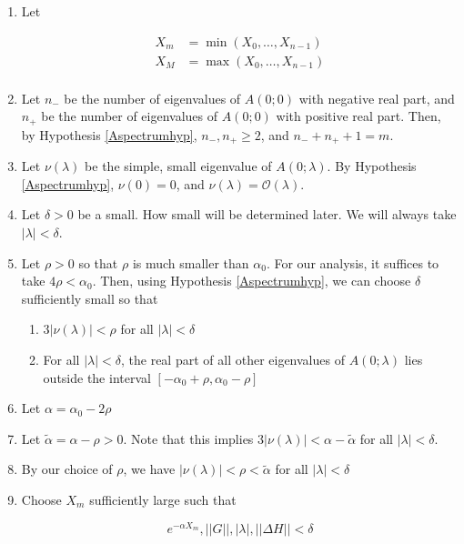 \documentclass[12pt]{article}
\begin{document}
\begin{enumerate}

	\item Let

	\begin{align*}
	X_m &= \min(X_0, \dots, X_{n-1}) \\
	X_M &= \max(X_0, \dots, X_{n-1}) \\
	\end{align*}

	\item Let $n_-$ be the number of eigenvalues of $A(0; 0)$ with negative real part, and $n_+$ be the number of eigenvalues of $A(0; 0)$ with positive real part. Then, by Hypothesis \ref{Aspectrumhyp}, $n_-, n_+ \geq 2$, and $n_- + n_+ + 1 = m$.

	\item Let $\nu(\lambda)$ be the simple, small eigenvalue of $A(0; \lambda)$. By Hypothesis \ref{Aspectrumhyp}, $\nu(0) = 0$, and $\nu(\lambda) = \mathcal{O}(\lambda)$. 

	\item Let $\delta > 0$ be a small. How small will be determined later. We will always take $|\lambda| < \delta$.

	\item Let $\rho > 0$ so that $\rho$ is much smaller than $\alpha_0$. For our analysis, it suffices to take $4 \rho < \alpha_0$. Then, using Hypothesis \ref{Aspectrumhyp}, we can choose $\delta$ sufficiently small so that 

	\begin{enumerate}
		\item $3 |\nu(\lambda)| < \rho$ for all $|\lambda| < \delta$ 
		\item For all $|\lambda| < \delta$, the real part of all other eigenvalues of $A(0; \lambda)$ lies outside the interval $[-\alpha_0 + \rho, \alpha_0 - \rho]$ 
	\end{enumerate}

	\item Let $\alpha = \alpha_0 - 2 \rho$

	\item Let $\tilde{\alpha} = \alpha - \rho > 0$. Note that this implies $3|\nu(\lambda)| < \alpha - \tilde{\alpha}$ for all $|\lambda| < \delta$.

	\item By our choice of $\rho$, we have $|\nu(\lambda)| < \rho < \tilde{\alpha}$ for all $|\lambda| < \delta$

	\item Choose $X_m$ sufficiently large such that

	\begin{equation}
	e^{-\alpha X_m}, ||G||, |\lambda|, ||\Delta H|| < \delta
	\end{equation}

\end{enumerate}
\end{document}
